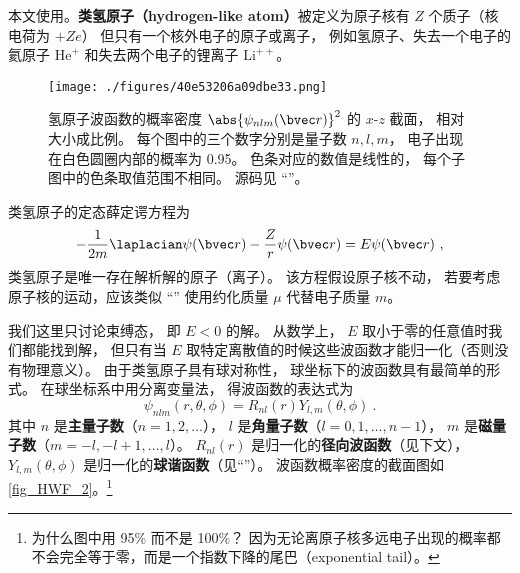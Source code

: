 

本文使用。\textbf{类氢原子（hydrogen-like atom）}被定义为原子核有 $Z$ 个质子（核电荷为 $+Ze$） 但只有一个核外电子的原子或离子， 例如氢原子、失去一个电子的氦原子 $\mathrm{He}^+$ 和失去两个电子的锂离子 $\mathrm{Li}^{++}$。 %

\begin{figure}[ht]
\centering
\texttt{[image: ./figures/40e53206a09dbe33.png]}
\caption{氢原子波函数的概率密度 $\abs{\psi_{nlm}(\bvec r)}^2$ 的 $x$-$z$ 截面， 相对大小成比例。 每个图中的三个数字分别是量子数 $n, l, m$， 电子出现在白色圆圈内部的概率为 0.95。 色条对应的数值是线性的， 每个子图中的色条取值范围不相同。 源码见 “”。} \label{fig_HWF_2}
\end{figure}

类氢原子的定态薛定谔方程为
\begin{equation}\label{eq_HWF_1}
-\frac{1}{2m} \laplacian \psi(\bvec r) - \frac{Z}{r} \psi(\bvec r) = E \psi(\bvec r)~,
\end{equation}
类氢原子是唯一存在解析解的原子（离子）。 该方程假设原子核不动， 若要考虑原子核的运动，应该类似 “” 使用约化质量 $\mu$ 代替电子质量 $m$。

我们这里只讨论束缚态， 即 $E < 0$ 的解。  从数学上， $E$ 取小于零的任意值时我们都能找到解， 但只有当 $E$ 取特定离散值的时候这些波函数才能归一化（否则没有物理意义）。 由于类氢原子具有球对称性， 球坐标下的波函数具有最简单的形式。 在球坐标系中用分离变量法， 得波函数的表达式为
\begin{equation}\label{eq_HWF_3}
\psi_{nlm} (r,\theta ,\phi) = R_{nl}(r) Y_{l,m}(\theta, \phi)~.
\end{equation}
其中 $n$ 是\textbf{主量子数}（$n = 1, 2, \dots$）， $l$ 是\textbf{角量子数}（$l = 0, 1, \dots, n - 1$）， $m$ 是\textbf{磁量子数}（$m = -l, -l+1, \dots, l$）。 $R_{nl}(r)$ 是归一化的\textbf{径向波函数}（见下文）， $Y_{l,m}(\theta, \phi)$ 是归一化的\textbf{球谐函数}（见“”）。 波函数概率密度的截面图如\autoref{fig_HWF_2}。\footnote{为什么图中用 95\% 而不是 100\%？ 因为无论离原子核多远电子出现的概率都不会完全等于零，而是一个指数下降的尾巴（exponential tail）。}

